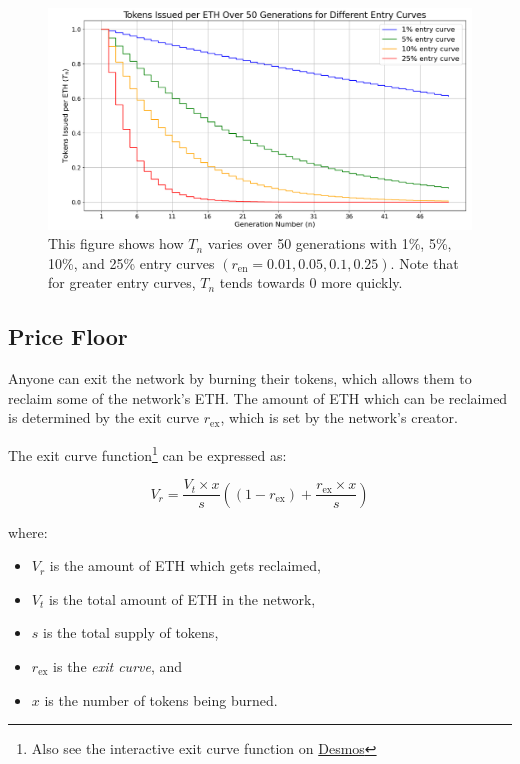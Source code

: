 \documentclass{article}
\begin{document}
\clearpage
\begin{figure}[h]
  \centering
  \includegraphics[width=\textwidth]{figures/multi-entry-curves.png}
  \caption{This figure shows how $T_n$ varies over 50 generations with 1\%, 5\%, 10\%, and 25\% entry curves $(r_{\text{en}} = 0.01, 0.05, 0.1, 0.25)$. Note that for greater entry curves, $T_n$ tends towards 0 more quickly.}
\end{figure}

\subsection{Price Floor}

Anyone can exit the network by burning their tokens, which allows them to reclaim some of the network's ETH. The amount of ETH which can be reclaimed is determined by the exit curve $r_{\text{ex}}$, which is set by the network's creator.

The exit curve function\footnote{Also see the interactive exit curve function on \href{https://www.desmos.com/calculator/9pewqesyj5}{Desmos}} can be expressed as:

\begin{equation}
  V_r = \frac{V_t \times x}{s}\left(\left(1-r_{\text{ex}}\right)+\frac{r_{\text{ex}} \times x}{s}\right)
\end{equation}

where:
\begin{itemize}
  \item $V_r$ is the amount of ETH which gets reclaimed,
  \item $V_t$ is the total amount of ETH in the network,
  \item $s$ is the total supply of tokens,
  \item $r_{\text{ex}}$ is the \textit{exit curve}, and
  \item $x$ is the number of tokens being burned.
\end{itemize}
\end{document}
